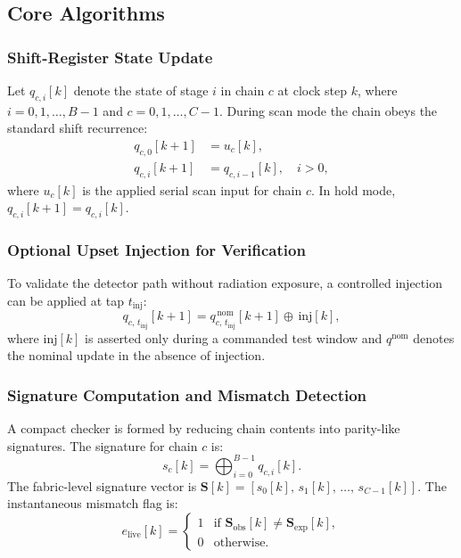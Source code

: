 \subsection{Core Algorithms}
\label{subsec:ch6_algorithms}

\subsubsection{Shift-Register State Update}

Let $q_{c,i}[k]$ denote the state of stage $i$ in chain $c$ at clock
step $k$, where $i = 0, 1, \ldots, B{-}1$ and $c = 0, 1, \ldots,
C{-}1$.  During scan mode the chain obeys the standard shift recurrence:
\begin{align}
    q_{c,0}[k+1]   &= u_c[k], \label{eq:scan_in} \\
    q_{c,i}[k+1]   &= q_{c,i-1}[k], \quad i > 0, \label{eq:scan_shift}
\end{align}
where $u_c[k]$ is the applied serial scan input for chain $c$.  In hold
mode, $q_{c,i}[k+1] = q_{c,i}[k]$.

\subsubsection{Optional Upset Injection for Verification}

To validate the detector path without radiation exposure, a controlled
injection can be applied at tap $t_\text{inj}$:
\begin{equation}
    q_{c,\,t_\text{inj}}[k+1] =
        q^{\,\text{nom}}_{c,\,t_\text{inj}}[k+1]
        \oplus \, \text{inj}[k],
    \label{eq:injection}
\end{equation}
where $\text{inj}[k]$ is asserted only during a commanded test window
and $q^\text{nom}$ denotes the nominal update in the absence of
injection.

\subsubsection{Signature Computation and Mismatch Detection}

A compact checker is formed by reducing chain contents into parity-like
signatures.  The signature for chain $c$ is:
\begin{equation}
    s_c[k] = \bigoplus_{i=0}^{B-1} q_{c,i}[k].
    \label{eq:sig}
\end{equation}
The fabric-level signature vector is $\mathbf{S}[k] = [s_0[k],\,
s_1[k],\, \ldots,\, s_{C-1}[k]]$.  The instantaneous mismatch flag is:
\begin{equation}
    e_\text{live}[k] =
    \begin{cases}
        1 & \text{if } \mathbf{S}_\text{obs}[k] \neq \mathbf{S}_\text{exp}[k], \\
        0 & \text{otherwise.}
    \end{cases}
    \label{eq:elive}
\end{equation}

